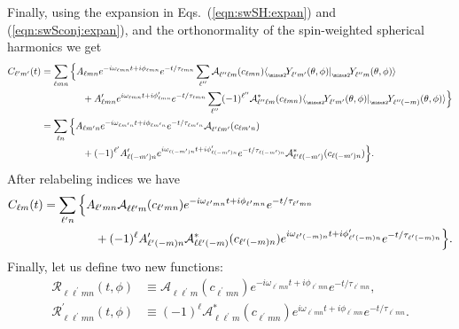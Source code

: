\documentclass[11pt]{article}
\newcommand{\braket}[2]{\langle #1|#2\rangle}
\newcommand{\swY}[4][]{{}_{{}_{#2}}\!Y^{#1}_{#3}(#4)}
\newcommand{\YSH}[3][]{\mathcal{A}^{#1}_{#2}(#3)}
\begin{document}
\noindent
Finally, using the expansion in Eqs.~(\ref{eqn:swSH:expan}) and (\ref{eqn:swSconj:expan}), and
the orthonormality of the spin-weighted spherical harmonics we get
\begin{equation}
\begin{aligned} \label{clm:eq3}
C_{\ell^\prime{m}^\prime}(t) & = \sum_{\ell{m}n} \Big\{ 
   A_{\ell{m}n} e^{-i\omega_{\ell{m}n}t+i\phi_{\ell{m}n}}e^{-t/\tau_{\ell{m}n}}
    \sum_{\ell^{\prime\prime}} \YSH{\ell^{\prime\prime}\ell{m}}{c_{\ell{m}n}}
    \braket{\swY{\minus 2}{\ell^\prime{m}^\prime}{\theta,\phi}}{\swY{\minus 2}{\ell^{\prime\prime}m}{\theta,\phi}} \\
& {} \hspace{0.6in}
  + A^\prime_{\ell{m}n} e^{i\omega_{\ell{m}n}t+i\phi^\prime_{\ell{m}n}}e^{-t/\tau_{\ell{m}n}}
    \sum_{\ell^{\prime\prime}} (-1)^{\ell^{\prime\prime}} \YSH[*]{\ell^{\prime\prime}\ell{m}}{c_{\ell{m}n}}
    \braket{\swY{\minus 2}{\ell^\prime{m}^\prime}{\theta,\phi}}{\swY{\minus 2}{\ell^{\prime\prime}(-m)}{\theta,\phi}} \Big\} \\ 
 & = \sum_{\ell{n}} \Big\{ 
   A_{\ell{m^\prime}n} e^{-i\omega_{\ell{m^\prime}n}t+i\phi_{\ell{m^\prime}n}}e^{-t/\tau_{\ell{m^\prime}n}}
    \YSH{\ell^\prime\ell{m^\prime}}{c_{\ell{m^\prime}n}} \\
& {} \hspace{0.6in}
  + (-1)^{\ell^\prime}A^\prime_{\ell(-m^\prime)n} e^{i\omega_{\ell(-m^\prime)n}t+i\phi^\prime_{\ell(-m^\prime)n}}e^{-t/\tau_{\ell(-m^\prime)n}}
    \YSH[*]{\ell^\prime\ell(-m^\prime)}{c_{\ell(-m^\prime)n}} \Big\}.
\end{aligned}
\end{equation}
After relabeling indices we have
\begin{equation}\label{eq:SphericalKerrModes}
\begin{aligned}
 C_{\ell{m}}(t) & = \sum_{\ell^\prime{n}} \Big\{ 
   A_{\ell^\prime{m}n}\YSH{\ell\ell^\prime{m}}{c_{\ell^\prime{m}n}}
    e^{-i\omega_{\ell^\prime{m}n}t+i\phi_{\ell^\prime{m}n}}e^{-t/\tau_{\ell^\prime{m}n}} \\
& {} \hspace{0.6in}
  + (-1)^\ell A^\prime_{\ell^\prime(-m)n}
    \YSH[*]{\ell\ell^\prime(-m)}{c_{\ell^\prime(-m)n}}
    e^{i\omega_{\ell^\prime(-m)n}t+i\phi^\prime_{\ell^\prime(-m)n}}e^{-t/\tau_{\ell^\prime(-m)n}} \Big\}.
\end{aligned}
\end{equation}
Finally, let us define two new functions:
\begin{align}
  \mathcal{R}_{\ell\ell^\prime{m}n}(t,\phi) &\equiv 
    \YSH{\ell\ell^\prime{m}}{c_{\ell^\prime{m}n}}
    e^{-i\omega_{\ell^\prime{m}n}t+i\phi_{\ell^\prime{m}n}}e^{-t/\tau_{\ell^\prime{m}n}}, \\
  \mathcal{R}^\prime_{\ell\ell^\prime{m}n}(t,\phi) &\equiv  
    (-1)^\ell\YSH[*]{\ell\ell^\prime{m}}{c_{\ell^\prime{m}n}}
    e^{i\omega_{\ell^\prime{m}n}t+i\phi_{\ell^\prime{m}n}}e^{-t/\tau_{\ell^\prime{m}n}}.
\end{align}
\end{document}
